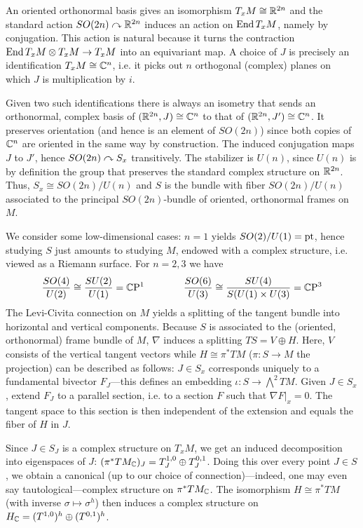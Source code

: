 \documentclass{scrartcl}
\begin{document}
An oriented orthonormal basis gives an isomorphism $T_xM\cong \mathbb{R}^{2n}$ and the standard action $SO(2n)\curvearrowright \mathbb{R}^{2n}$ induces an action on $\operatorname{End} T_xM$, namely by conjugation. This action is natural because it turns the contraction $\operatorname{End} T_xM\otimes T_xM\to T_xM$ into an equivariant map. A choice of $J$ is precisely an identification $T_xM\cong \mathbb{C}^n$, i.e. it picks out $n$ orthogonal (complex) planes on which $J$ is multiplication by $i$. 

\medskip

Given two such identifications there is always an isometry that sends an orthonormal, complex basis of $(\mathbb{R}^{2n},J)\cong \mathbb{C}^n$ to that of $(\mathbb{R}^{2n},J')\cong \mathbb{C}^n$. It preserves orientation (and hence is an element of $SO(2n)$) since both copies of $\mathbb{C}^n$ are oriented in the same way by construction. The induced conjugation maps $J$ to $J'$, hence $SO(2n)\curvearrowright S_x$ transitively. The stabilizer is $U(n)$, since $U(n)$ is by definition the group that preserves the standard complex structure on $\mathbb{R}^{2n}$. Thus, $S_x\cong SO(2n)/U(n)$ and $S$ is the bundle with fiber $SO(2n)/U(n)$ associated to the principal $SO(2n)$-bundle of oriented, orthonormal frames on $M$.

\medskip

We consider some low-dimensional cases: $n=1$ yields $SO(2)/U(1)=\mathrm{pt}$, hence studying $S$ just amounts to studying $M$, endowed with a complex structure, i.e. viewed as a Riemann surface. For $n=2,3$ we have
\begin{equation*}
	\frac{SO(4)}{U(2)}\cong \frac{SU(2)}{U(1)}=\mathbb{C}\mathrm{P}^1 \qquad \qquad 
	\frac{SO(6)}{U(3)}\cong \frac{SU(4)}{S(U(1)\times U(3)}=\mathbb{C}\mathrm{P}^3
\end{equation*}
The Levi-Civita connection on $M$ yields a splitting of the tangent bundle into horizontal and vertical components. Because $S$ is associated to the (oriented, orthonormal) frame bundle of $M$, $\nabla$ induces a splitting $TS=V\oplus H$. Here, $V$ consists of the vertical tangent vectors while $H\cong \pi^*TM$ ($\pi:S\to M$ the projection) can be described as follows: $J\in S_x$ corresponds uniquely to a fundamental bivector $F_J$---this defines an embedding $\iota:S\to \bigwedge^2 TM$. Given $J\in S_x$, extend $F_J$ to a parallel section, i.e. to a section $F$ such that $\nabla F|_x=0$. The tangent space to this section is then independent of the extension and equals the fiber of $H$ in $J$.

\medskip

Since $J\in S_J$ is a complex structure on $T_x M$, we get an induced decomposition into eigenspaces of $J$: $(\pi^*TM_{\mathbb{C}})_J=T^{1,0}_J\oplus T^{0,1}_J$. Doing this over every point $J\in S$, we obtain a canonical (up to our choice of connection)---indeed, one may even say tautological---complex structure on $\pi^*TM_{\mathbb{C}}$. The isomorphism $H\cong \pi^* TM$ (with inverse $\sigma\mapsto \sigma^h$) then induces a complex structure on $H_{\mathbb{C}}=(T^{1,0})^h\oplus (T^{0,1})^h$.
\end{document}
